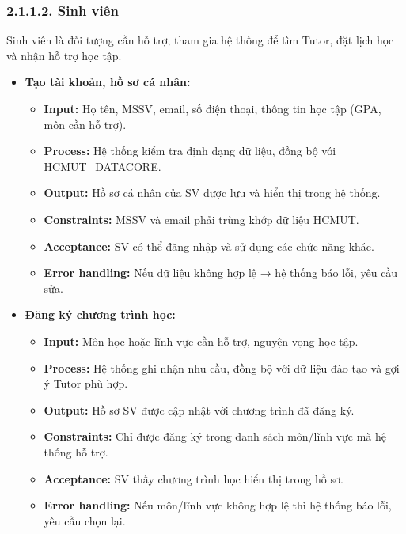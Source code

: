 \subsubsection*{2.1.1.2. Sinh viên}
 Sinh viên là đối tượng cần hỗ trợ, tham gia hệ thống để tìm Tutor, đặt lịch học và nhận hỗ trợ học tập.
\begin{itemize}
    \item \textbf{Tạo tài khoản, hồ sơ cá nhân:}
    \begin{itemize}
        \item \textbf{Input:} Họ tên, MSSV, email, số điện thoại, thông tin học tập (GPA, môn cần hỗ trợ).
        \item \textbf{Process:} Hệ thống kiểm tra định dạng dữ liệu, đồng bộ với HCMUT\_DATACORE.
        \item \textbf{Output:} Hồ sơ cá nhân của SV được lưu và hiển thị trong hệ thống.
        \item \textbf{Constraints:} MSSV và email phải trùng khớp dữ liệu HCMUT.
        \item \textbf{Acceptance:} SV có thể đăng nhập và sử dụng các chức năng khác.
        \item \textbf{Error handling:} Nếu dữ liệu không hợp lệ → hệ thống báo lỗi, yêu cầu sửa.
    \end{itemize}

    \item \textbf{Đăng ký chương trình học:}
    \begin{itemize}
        \item \textbf{Input:} Môn học hoặc lĩnh vực cần hỗ trợ, nguyện vọng học tập.
        \item \textbf{Process:} Hệ thống ghi nhận nhu cầu, đồng bộ với dữ liệu đào tạo và gợi ý Tutor phù hợp.
        \item \textbf{Output:} Hồ sơ SV được cập nhật với chương trình đã đăng ký.
        \item \textbf{Constraints:} Chỉ được đăng ký trong danh sách môn/lĩnh vực mà hệ thống hỗ trợ.
        \item \textbf{Acceptance:} SV thấy chương trình học hiển thị trong hồ sơ.
        \item \textbf{Error handling:} Nếu môn/lĩnh vực không hợp lệ thì hệ thống báo lỗi, yêu cầu chọn lại.
    \end{itemize}


\end{itemize}
